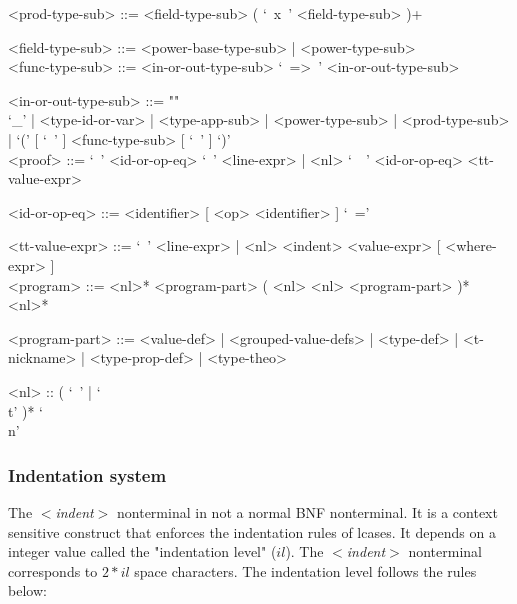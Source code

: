 \documentclass{article}
\begin{document}
\begin{grammar}
<prod-type-sub> ::= <field-type-sub> ( `\ x\ ' <field-type-sub> )+

<field-type-sub> ::= <power-base-type-sub> | <power-type-sub>
\\

<func-type-sub> ::= <in-or-out-type-sub> `\ =>\ ' <in-or-out-type-sub>

<in-or-out-type-sub> ::= ""\\
`_' | <type-id-or-var> | <type-app-sub> | <power-type-sub> | <prod-type-sub> |
`(' [ `\ ' ] <func-type-sub> [ `\ ' ] `)'
\\

<proof> ::= 
`\ ' <id-or-op-eq> `\ ' <line-expr> |
<nl> `\ \ ' <id-or-op-eq>  <tt-value-expr>

<id-or-op-eq> ::= <identifier> [ <op> <identifier> ] `\ ='

<tt-value-expr> ::=
`\ ' <line-expr> | <nl> <indent> <value-expr> [ <where-expr> ]
\\

<program> ::=
<nl>* <program-part> ( <nl> <nl> <program-part> )* <nl>*

<program-part> ::=
<value-def> | <grouped-value-defs> | <type-def> | <t-nickname> |
<type-prop-def> | <type-theo>

<nl> :: ( `\ ' | `\\t' )* `\\n'
\end{grammar}

\newpage

\subsubsection{Indentation system}
\label{subsubsec:indsys}

The \textit{$<$indent$>$} nonterminal in not a normal BNF nonterminal. It is a
context sensitive construct that enforces the indentation rules of lcases.
It depends on a integer value called the "indentation level" ($il$).
The \textit{$<$indent$>$} nonterminal corresponds to $2*il$ space characters.
The indentation level follows the rules below:
\end{document}
